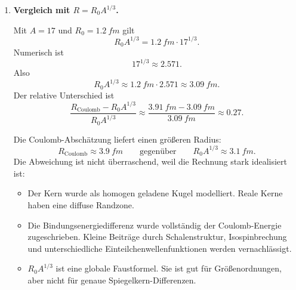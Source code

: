 \documentclass[11pt,a4paper]{scrartcl}
\newcommand{\isotope}[2]{^{#1}\mathrm{#2}}
\theoremstyle{definition}
\theoremstyle{plain}
\theoremstyle{remark}
\begin{document}
\begin{enumerate}[label=(\alph*)]
    \begin{calculationbox}[title=Einsetzen der Bindungsenergiedifferenz]
        Wir identifizieren n\"aherungsweise
        \[
            \Delta E_C \approx E_B(\isotope{17}{O})-E_B(\isotope{17}{F})=\SI{3.54}{MeV}.
        \]
        Damit
        \[
            \SI{3.54}{MeV}
            =\frac{48}{5}\frac{\alpha\hbar c}{R}.
        \]
        Aufl\"osen nach $R$ ergibt
        \[
            R=\frac{48}{5}\frac{\alpha\hbar c}{\SI{3.54}{MeV}}.
        \]
        Mit $\alpha\hbar c\approx\SI{1.440}{MeV.fm}$ folgt
        \[
            R
            =\frac{48}{5}\frac{\SI{1.440}{MeV.fm}}{\SI{3.54}{MeV}}
            \approx \SI{3.91}{fm}.
        \]
    \end{calculationbox}

    \begin{answerbox}
        \[
            \boxed{R_{\mathrm{Coulomb}}\approx\SI{3.9}{fm}}.
        \]
    \end{answerbox}

    \item \textbf{Vergleich mit $R=R_0A^{1/3}$.}

    \begin{calculationbox}
        Mit $A=17$ und $R_0=\SI{1.2}{fm}$ gilt
        \[
            R_{0}A^{1/3}
            =\SI{1.2}{fm}\cdot 17^{1/3}.
        \]
        Numerisch ist
        \[
            17^{1/3}\approx 2.571.
        \]
        Also
        \[
            R_{0}A^{1/3}
            \approx \SI{1.2}{fm}\cdot 2.571
            \approx \SI{3.09}{fm}.
        \]
        Der relative Unterschied ist
        \[
            \frac{R_{\mathrm{Coulomb}}-R_0A^{1/3}}{R_0A^{1/3}}
            \approx
            \frac{\SI{3.91}{fm}-\SI{3.09}{fm}}{\SI{3.09}{fm}}
            \approx 0.27.
        \]
    \end{calculationbox}

    \begin{solutionbox}
        Die Coulomb-Absch\"atzung liefert einen gr\"o\ss{}eren Radius:
        \[
            R_{\mathrm{Coulomb}}\approx\SI{3.9}{fm}
            \qquad\text{gegen\"uber}\qquad
            R_0A^{1/3}\approx\SI{3.1}{fm}.
        \]
        Die Abweichung ist nicht \"uberraschend, weil die Rechnung stark idealisiert ist:
        \begin{itemize}
            \item Der Kern wurde als homogen geladene Kugel modelliert. Reale Kerne haben eine diffuse Randzone.
            \item Die Bindungsenergiedifferenz wurde vollst\"andig der Coulomb-Energie zugeschrieben. Kleine Beitr\"age durch Schalenstruktur, Isospinbrechung und unterschiedliche Einteilchenwellenfunktionen werden vernachl\"assigt.
            \item $R_0A^{1/3}$ ist eine globale Faustformel. Sie ist gut f\"ur Gr\"o\ss{}enordnungen, aber nicht f\"ur genaue Spiegelkern-Differenzen.
        \end{itemize}
    \end{solutionbox}


\end{enumerate}
\end{document}
